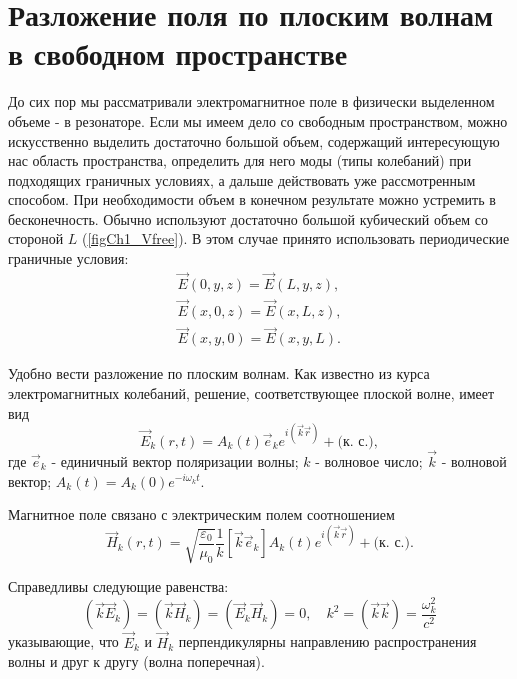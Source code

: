 \section{Разложение поля по плоским волнам в свободном пространстве}
До сих пор мы рассматривали электромагнитное поле в физически
выделенном объеме - в резонаторе. Если мы имеем дело со свободным
пространством, можно искусственно выделить достаточно большой объем,
содержащий интересующую нас область пространства, определить для него
моды (типы колебаний) при подходящих граничных условиях, а дальше
действовать уже рассмотренным способом. При необходимости объем в
конечном результате можно устремить в бесконечность. Обычно используют
достаточно большой кубический объем со стороной  $L$  
(\autoref{figCh1_Vfree}). В этом случае принято использовать
периодические граничные условия:  
\begin{eqnarray}
\vec{E}\left(0, y, z \right) = \vec{E}\left(L, y, z \right),
\nonumber \\
\vec{E}\left(x, 0, z \right) = \vec{E}\left(x, L, z \right),
\nonumber \\
\vec{E}\left(x, y, 0 \right) = \vec{E}\left(x, y, L \right).
\label{eqCh1_period_def}
\end{eqnarray}



Удобно вести разложение по плоским волнам. Как известно из курса
электромагнитных колебаний, решение, соответствующее плоской волне,
имеет вид 
\begin{equation}
\vec{E}_k\left(r, t\right) = 
A_k\left(t\right)\vec{e}_k e^{i\left(\vec{k}\vec{r}\right)} +
\mbox{(к. с.)},
\label{eqCh1_Emode}
\end{equation}
где $\vec{e}_k$ - единичный вектор поляризации волны;  
$k$ - волновое число; $\vec{k}$ - волновой вектор;  
$A_k\left(t\right) = A_k\left(0\right) e^{-i \omega_k t}$.

Магнитное поле связано с электрическим полем соотношением
\begin{equation}
\vec{H}_k\left(r, t\right) =
\sqrt{\frac{\varepsilon_0}{\mu_0}}
\frac{1}{k}\left[\vec{k} \vec{e}_k\right] A_k\left(t\right) 
e^{i\left(\vec{k}\vec{r}\right)} + \mbox{(к. с.)}
.
\label{eqCh1_Hmode}
\end{equation}

Справедливы следующие равенства:
\begin{equation}
\left(\vec{k}\vec{E}_k\right) = 
\left(\vec{k}\vec{H}_k\right) = 
\left(\vec{E}_k\vec{H}_k\right) = 0,
\quad
k^2 = \left(\vec{k}\vec{k}\right) = 
\frac{\omega_k^2}{c^2} 
\end{equation}
указывающие, что 
$\vec{E}_k$
и $\vec{H}_k$ перпендикулярны направлению распространения волны и друг
к другу (волна поперечная). 

